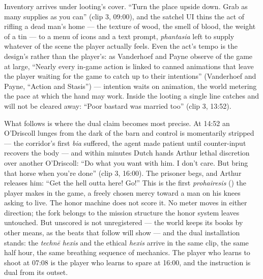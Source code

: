 Inventory arrives under looting's cover. ``Turn the place upside down. Grab as many supplies as you can'' (clip 3, 09:00), and the satchel UI thins the act of rifling a dead man's home — the texture of wood, the smell of blood, the weight of a tin — to a menu of icons and a text prompt, \textit{phantasia} left to supply whatever of the scene the player actually feels.
Even the act's tempo is the design's rather than the player's: as Vanderhoef and Payne observe of the game at large, ``Nearly every in-game action is linked to canned animations that leave the player waiting for the game to catch up to their intentions'' (Vanderhoef and Payne, ``Action and Stasis'') — intention waits on animation, the world metering the pace at which the hand may work. Inside the looting a single line catches and will not be cleared away: ``Poor bastard was married too'' (clip 3, 13:52). 

What follows is where the dual claim becomes most precise. At 14:52 an O'Driscoll lunges from the dark of the barn and control is momentarily stripped — the corridor's first \textit{bia} suffered, the agent made patient until counter-input recovers the body — and within minutes Dutch hands Arthur lethal discretion over another O'Driscoll: ``Do what you want with him. I don't care. But bring that horse when you're done'' (clip 3, 16:00). The prisoner begs, and Arthur releases him: ``Get the hell outta here! Go!'' This is the first \textit{prohairesis} () the player makes in the game, a freely chosen mercy toward a man on his knees asking to live. The honor machine does not score it. No meter moves in either direction; the fork belongs to the mission structure the honor system leaves untouched. But unscored is not unregistered — the world keeps its books by other means, as the beats that follow will show — and the dual installation stands: the \textit{technē} \textit{hexis} and the ethical \textit{hexis} arrive in the same clip, the same half hour, the same breathing sequence of mechanics. The player who learns to shoot at 07:08 is the player who learns to spare at 16:00, and the instruction is dual from its outset.

